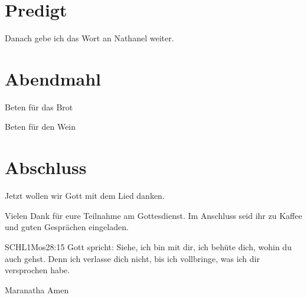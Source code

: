 \documentclass{../../inc/mybib}
\begin{document}
\section{Predigt}

Danach gebe ich das Wort an Nathanel weiter.



\section{Abendmahl}

Beten für das Brot


Beten für den Wein


\section{Abschluss}

Jetzt wollen wir Gott mit dem Lied  danken.

Vielen Dank für eure Teilnahme am Gottesdienst. Im Anschluss seid ihr zu Kaffee und guten Gesprächen eingeladen.
\beten{}

\begin{bibelbox}{SCHL}{1Mos}{28:15}
Gott spricht: Siehe, ich bin mit dir,
ich behüte dich, wohin du auch gehst.
Denn ich verlasse dich nicht,
bis ich vollbringe, was ich dir versprochen habe.
\end{bibelbox}

Maranatha Amen
\end{document}
